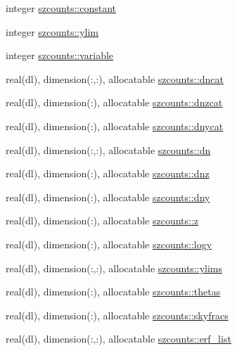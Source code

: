 \begin{DoxyCompactItemize}
\item 
integer \mbox{\hyperlink{namespaceszcounts_a9d5e47bc9753495f7e786d6a346a0430}{szcounts\+::constant}}
\item 
integer \mbox{\hyperlink{namespaceszcounts_a2113fbfc3fd3f4f7d482dfc83ed3ce40}{szcounts\+::ylim}}
\item 
integer \mbox{\hyperlink{namespaceszcounts_a971abc806d9e41dbb94fcf7b448b1c91}{szcounts\+::variable}}
\item 
real(dl), dimension(\+:,\+:), allocatable \mbox{\hyperlink{namespaceszcounts_a97eccbe43cd988a15f416908d5032a54}{szcounts\+::dncat}}
\item 
real(dl), dimension(\+:), allocatable \mbox{\hyperlink{namespaceszcounts_a7a9570e041772a0a85c72608e5bd79b8}{szcounts\+::dnzcat}}
\item 
real(dl), dimension(\+:), allocatable \mbox{\hyperlink{namespaceszcounts_ad8ce700b221def6cc6adfbbac449cdec}{szcounts\+::dnycat}}
\item 
real(dl), dimension(\+:,\+:), allocatable \mbox{\hyperlink{namespaceszcounts_a169b8a0331217f4777d810a37e5459c2}{szcounts\+::dn}}
\item 
real(dl), dimension(\+:), allocatable \mbox{\hyperlink{namespaceszcounts_aa90e9286036783e86cde085a3266838c}{szcounts\+::dnz}}
\item 
real(dl), dimension(\+:), allocatable \mbox{\hyperlink{namespaceszcounts_aed7311f56ea05af971cdd62ed4d8ff1c}{szcounts\+::dny}}
\item 
real(dl), dimension(\+:), allocatable \mbox{\hyperlink{namespaceszcounts_a1bde530b627f5318a6681ddc544355d6}{szcounts\+::z}}
\item 
real(dl), dimension(\+:), allocatable \mbox{\hyperlink{namespaceszcounts_a42ba2df42e9722f2624e5f3e187731c3}{szcounts\+::logy}}
\item 
real(dl), dimension(\+:,\+:), allocatable \mbox{\hyperlink{namespaceszcounts_a237475f3cddb3344fb45713300e0fe94}{szcounts\+::ylims}}
\item 
real(dl), dimension(\+:), allocatable \mbox{\hyperlink{namespaceszcounts_a5717e85376dd2fd0bb2bb0eb6fb9e7fb}{szcounts\+::thetas}}
\item 
real(dl), dimension(\+:), allocatable \mbox{\hyperlink{namespaceszcounts_aae1d8f46899dd92909f27129c9866db5}{szcounts\+::skyfracs}}
\item 
real(dl), dimension(\+:,\+:), allocatable \mbox{\hyperlink{namespaceszcounts_abc9374ee47357a4c1c760d45a0336faf}{szcounts\+::erf\+\_\+list}}
\item 

\end{DoxyCompactItemize}

